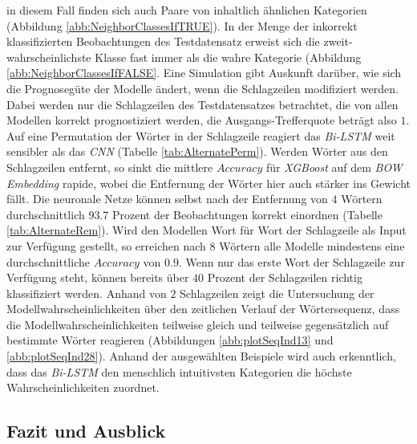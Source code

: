 \documentclass[a4paper,11pt]{article}
\begin{document}
in diesem Fall finden sich auch Paare von inhaltlich ähnlichen Kategorien (Abbildung \ref{abb:NeighborClassesIfTRUE}). In der Menge der inkorrekt klassifizierten Beobachtungen des Testdatensatz erweist sich die zweit-wahrscheinlichste Klasse fast immer als die wahre Kategorie (Abbildung \ref{abb:NeighborClassesIfFALSE}. Eine Simulation gibt Auskunft darüber, wie sich die Prognosegüte der Modelle ändert, wenn die Schlagzeilen modifiziert werden. Dabei werden nur die Schlagzeilen des Testdatensatzes betrachtet, die von allen Modellen korrekt prognostiziert werden, die Ausgangs-Trefferquote beträgt also $1$. Auf eine Permutation der Wörter in der Schlagzeile reagiert das \textit{Bi-LSTM} weit sensibler als das \textit{CNN} (Tabelle \ref{tab:AlternatePerm}). Werden Wörter aus den Schlagzeilen entfernt, so sinkt die mittlere $Accuracy$ für \textit{XGBoost} auf dem \textit{BOW} \textit{Embedding} rapide, wobei die Entfernung der Wörter hier auch stärker ins Gewicht fällt. Die neuronale Netze können selbst nach der Entfernung von $4$ Wörtern durchschnittlich $93.7$ Prozent der Beobachtungen korrekt einordnen (Tabelle \ref{tab:AlternateRem}). Wird den Modellen Wort für Wort der Schlagzeile als Input zur Verfügung gestellt, so erreichen nach $8$ Wörtern alle Modelle mindestens eine durchschnittliche $Accuracy$ von $0.9$. Wenn nur das erste Wort der Schlagzeile zur Verfügung steht, können bereits über $40$ Prozent der Schlagzeilen richtig klassifiziert werden. Anhand von $2$ Schlagzeilen zeigt die Untersuchung der Modellwahrscheinlichkeiten über den zeitlichen Verlauf der Wörtersequenz, dass die Modellwahrscheinlichkeiten teilweise gleich und teilweise gegensätzlich auf bestimmte Wörter reagieren (Abbildungen \ref{abb:plotSeqInd13} und \ref{abb:plotSeqInd28}). Anhand der ausgewählten Beispiele wird auch erkenntlich, dass das \textit{Bi-LSTM} den menschlich intuitivsten Kategorien die höchste Wahrscheinlichkeiten zuordnet. 


\subsection{Fazit und Ausblick}
\end{document}
